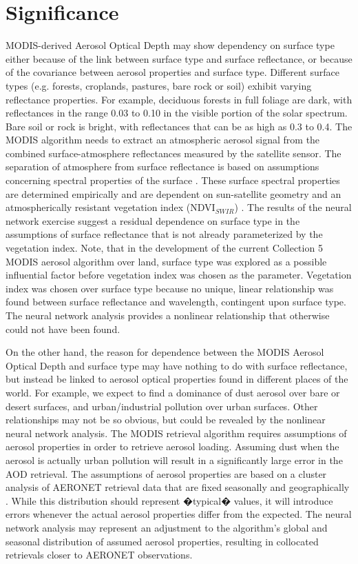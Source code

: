 \documentclass[journal]{IEEEtran}
\begin{document}
\section{Significance}

MODIS-derived Aerosol Optical Depth may show dependency on surface type either because of the link between surface type and surface reflectance, or because of the covariance between aerosol properties and surface type.  Different surface types (e.g. forests, croplands, pastures, bare rock or soil) exhibit varying reflectance properties.  For example, deciduous forests in full foliage are dark, with reflectances in the range 0.03 to 0.10 in the visible portion of the solar spectrum. Bare soil or rock is bright, with reflectances that can be as high as 0.3 to 0.4.  The MODIS algorithm needs to extract an atmospheric aerosol signal from the combined surface-atmosphere reflectances measured by the satellite sensor.  The separation of atmosphere from surface reflectance is based on assumptions concerning spectral properties of the surface \cite{Levy:2007a}.   These surface spectral properties are determined empirically and are dependent on sun-satellite geometry and an atmospherically resistant vegetation index (NDVI$_{SWIR}$) \cite{Levy:2007a, Karnieli:2001}.  The results of the neural network exercise suggest a residual dependence on surface type in the assumptions of surface reflectance that is not already parameterized by the vegetation index.  Note, that in the development of the current Collection 5 MODIS aerosol algorithm over land, surface type was explored as a possible influential factor before vegetation index was chosen as the parameter.  Vegetation index was chosen over surface type because no unique, linear relationship was found between surface reflectance and wavelength, contingent upon surface type.  The neural network analysis provides a nonlinear relationship that otherwise could not have been found.

On the other hand, the reason for dependence between the MODIS Aerosol Optical Depth and surface type may have nothing to do with surface reflectance, but instead be linked to aerosol optical properties found in different places of the world.  For example, we expect to find a dominance of dust aerosol over bare or desert surfaces, and urban/industrial pollution over urban surfaces.  Other relationships may not be so obvious, but could be revealed by the nonlinear neural network analysis.  The MODIS retrieval algorithm requires assumptions of aerosol properties in order to retrieve aerosol loading.  Assuming dust when the aerosol is actually urban pollution will result in a significantly large error in the AOD retrieval.  The assumptions of aerosol properties are based on a cluster analysis of AERONET retrieval data that are fixed seasonally and geographically \cite{Levy:2007b}.  While this distribution should represent �typical� values, it will introduce errors whenever the actual aerosol properties differ from the expected.  The neural network analysis may represent an adjustment to the algorithm's global and seasonal distribution of assumed aerosol properties, resulting in collocated retrievals closer to AERONET observations.
\end{document}
